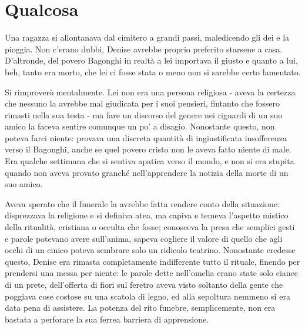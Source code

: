 \chapter{Qualcosa}

Una ragazza si allontanava dal cimitero a grandi passi, maledicendo gli dei e la pioggia. Non c'erano dubbi, Denise avrebbe proprio preferito starsene a casa. D'altronde, del povero Bagonghi in realtà a lei importava il giusto e quanto a lui, beh, tanto era morto, che lei ci fosse stata o meno non si sarebbe certo lamentato.

Si rimproverò mentalmente. Lei non era una persona religiosa - aveva la certezza che nessuno la avrebbe mai giudicata per i suoi pensieri, fintanto che fossero rimasti nella sua testa - ma fare un discorso del genere nei riguardi di un suo amico la faceva sentire comunque un po' a disagio. Nonostante questo, non poteva farci niente: provava una discreta quantità di ingiustificata insofferenza verso il Bagonghi, anche se quel povero cristo non le aveva fatto niente di male. Era qualche settimana che si sentiva apatica verso il mondo, e non si era stupita quando non aveva provato granché nell'apprendere la notizia della morte di un suo amico.

Aveva sperato che il funerale la avrebbe fatta rendere conto della situazione: disprezzava la religione e si definiva atea, ma capiva e temeva l'aspetto mistico della ritualità, cristiana o occulta che fosse; conosceva la presa che semplici gesti e parole potevano avere sull'anima, sapeva cogliere il valore di quello che agli occhi di un cinico poteva sembrare solo un ridicolo teatrino. Nonostante credesse questo, Denise era rimasta completamente indifferente tutto il rituale, finendo per prendersi una messa per niente: le parole dette nell'omelia erano state solo ciance di un prete, dell'offerta di fiori sul feretro aveva visto soltanto della gente che poggiava cose costose su una scatola di legno, ed alla sepoltura nemmeno si era data pena di assistere. La potenza del rito funebre, semplicemente, non era bastata a perforare la sua ferrea barriera di apprensione.

